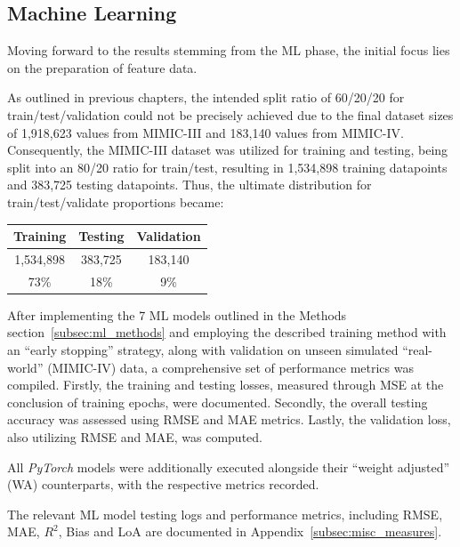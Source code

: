 \newpage

\subsection{Machine Learning}
\label{subsec:machine_learning}

Moving forward to the results stemming from the ML phase, the initial focus lies on the preparation of feature data.

As outlined in previous chapters, the intended split ratio of 60/20/20 for train/test/validation could not be precisely achieved due to the final dataset sizes of 1,918,623 values from MIMIC-III and 183,140 values from MIMIC-IV\@.
Consequently, the MIMIC-III dataset was utilized for training and testing, being split into an 80/20 ratio for train/test, resulting in 1,534,898 training datapoints and 383,725 testing datapoints.
Thus, the ultimate distribution for train/test/validate proportions became:

\begin{center}
    \begin{tabular}{|c|c|c|}
        \hline
        Training  & Testing & Validation \\
        \hline
        1,534,898 & 383,725 & 183,140    \\
        \hline
        73\%      & 18\%    & 9\%        \\
        \hline
    \end{tabular}
\end{center}

After implementing the 7 ML models outlined in the Methods section~\ref{subsec:ml_methods} and employing the described training method with an \enquote{early stopping} strategy,
along with validation on unseen simulated \enquote{real-world} (MIMIC-IV) data, a comprehensive set of performance metrics was compiled.
Firstly, the training and testing losses, measured through MSE at the conclusion of training epochs, were documented.
Secondly, the overall testing accuracy was assessed using RMSE and MAE metrics.
Lastly, the validation loss, also utilizing RMSE and MAE, was computed.

All \textit{PyTorch} models were additionally executed alongside their \enquote{weight adjusted} (WA) counterparts, with the respective metrics recorded.

The relevant ML model testing logs and performance metrics, including RMSE, MAE, \textit{$R^2$}, Bias and LoA are documented in Appendix~\ref{subsec:misc_measures}.

